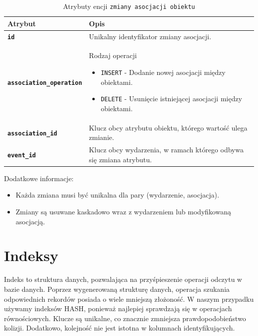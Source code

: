 \begin{table}[H]
    \centering
    \renewcommand{\arraystretch}{1.6}
    \begin{tabular}{|>{\bfseries}l|p{}|}
        \hline
        \rowcolor[HTML]{EFEFEF} \textbf{Atrybut} & \textbf{Opis} \\
        \hline
        \texttt{id} & Unikalny identyfikator zmiany asocjacji. \\
        \hline
        \texttt{association\_operation} & Rodzaj operacji
        \begin{itemize}
            \item \texttt{INSERT} - Dodanie nowej asocjacji między obiektami.
            \item \texttt{DELETE} - Usunięcie istniejącej asocjacji między obiektami.
        \end{itemize} \\
        \hline
        \texttt{association\_id} & Klucz obcy atrybutu obiektu, którego wartość ulega zmianie. \\
        \hline
        \texttt{event\_id} & Klucz obcy wydarzenia, w ramach którego odbywa się zmiana atrybutu. \\
        \hline
    \end{tabular}
    \caption{Atrybuty encji \texttt{zmiany asocjacji obiektu}}
\end{table}

Dodatkowe informacje:
\begin{itemize}
    \item Każda zmiana musi być unikalna dla pary (wydarzenie, asocjacja).
    \item Zmiany są usuwane kaskadowo wraz z wydarzeniem lub modyfikowaną asocjacją.
\end{itemize}

\section{Indeksy}

Indeks to struktura danych, pozwalająca na przyśpieszenie operacji odczytu w bazie danych.
Poprzez wygenerowaną strukturę danych, operacja szukania odpowiednich rekordów posiada o wiele mniejszą złożoność.
W naszym przypadku używamy indeksów HASH, ponieważ najlepiej sprawdzają się w operacjach równościowych.
Klucze są unikalne, co znacznie zmniejsza prawdopodobieństwo kolizji. Dodatkowo, kolejność
nie jest istotna w kolumnach identyfikujących.

